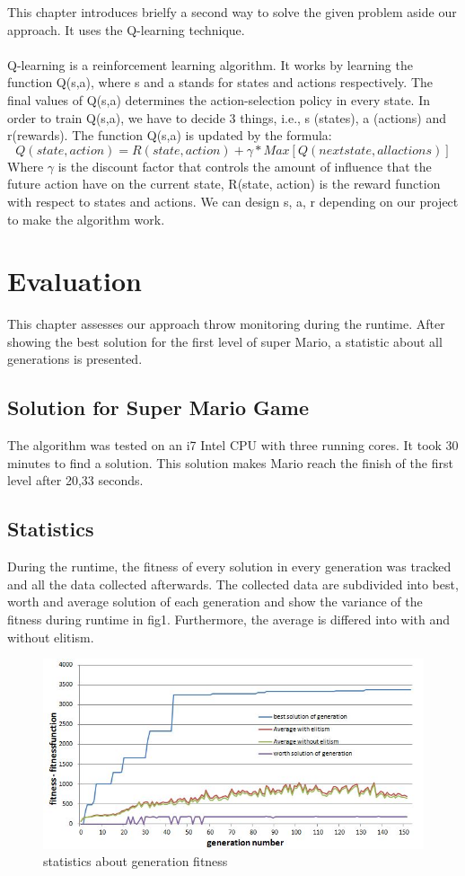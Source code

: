 \documentclass[a4paper]{article}
\begin{document}
This chapter introduces brielfy a second way to solve the given problem aside our approach. It uses the Q-learning technique. \\ \\
Q-learning is a reinforcement learning algorithm. It works by learning the function Q(s,a), where s and a stands for states and actions respectively. The final values of Q(s,a) determines the action-selection policy in every state. In order to train Q(s,a), we have to decide 3 things, i.e., s (states), a (actions) and r(rewards). The function Q(s,a) is updated by the formula:
\[Q(state, action) = R(state, action) + \gamma * Max[Q(next state, all actions)] \]
Where $\gamma$ is the discount factor that controls the amount of influence that the future action have on the current state, R(state, action) is the reward function with respect to states and actions. We can design s, a, r depending on our project to make the algorithm work.


\section{Evaluation}
This chapter assesses our approach throw monitoring during the runtime. After showing the best solution for the first level of super Mario, a statistic about all generations is presented.

\subsection{Solution for Super Mario Game}
The algorithm was tested on an i7 Intel CPU with three running cores. It took 30 minutes to find a solution. This solution makes Mario reach the finish of the first level after 20,33 seconds.

\subsection{Statistics}
During the runtime, the fitness of every solution in every generation was tracked and all the data collected afterwards. The collected data are subdivided into best, worth and average solution of each generation and show the variance of the fitness during runtime in fig1. Furthermore, the average is differed into with and without elitism.

\begin{figure}[ht]
\centering
\includegraphics[scale=0.7]{statistic.jpg}
\caption{ statistics about generation fitness }
\label{fig1}
\end{figure}
\end{document}
